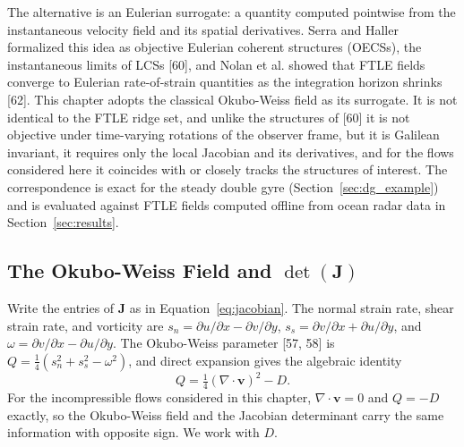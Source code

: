 \documentclass[12pt, letterpaper, oneside]{report}
\begin{document}
The alternative is an Eulerian surrogate: a quantity computed pointwise
from the instantaneous velocity field and its spatial derivatives. Serra
and Haller formalized this idea as objective Eulerian coherent structures
(OECSs), the instantaneous limits of LCSs [60], and Nolan et al. showed
that FTLE fields converge to Eulerian rate-of-strain quantities as the
integration horizon shrinks [62]. This chapter adopts the classical
Okubo-Weiss field as its surrogate. It is not identical to the FTLE ridge
set, and unlike the structures of [60] it is not objective under
time-varying rotations of the observer frame, but it is Galilean
invariant, it requires only the local Jacobian and its derivatives, and
for the flows considered here it coincides with or closely tracks the
structures of interest. The correspondence is exact for the steady double
gyre (Section~\ref{sec:dg_example}) and is evaluated against FTLE fields
computed offline from ocean radar data in Section~\ref{sec:results}.

\subsection{The Okubo-Weiss Field and \texorpdfstring{$\det(\mathbf{J})$}{det(J)}}

Write the entries of $\mathbf{J}$ as in Equation~\eqref{eq:jacobian}. The
normal strain rate, shear strain rate, and vorticity are
$s_n=\partial u/\partial x-\partial v/\partial y$,
$s_s=\partial v/\partial x+\partial u/\partial y$, and
$\omega=\partial v/\partial x-\partial u/\partial y$. The Okubo-Weiss
parameter [57, 58] is $Q=\tfrac14(s_n^2+s_s^2-\omega^2)$, and direct
expansion gives the algebraic identity
\begin{equation}
Q = \tfrac14(\nabla\cdot\mathbf{v})^2 - D.
\label{eq:okubo_weiss}
\end{equation}
For the incompressible flows considered in this chapter,
$\nabla\cdot\mathbf{v}=0$ and $Q=-D$ exactly, so the Okubo-Weiss field and
the Jacobian determinant carry the same information with opposite sign. We
work with $D$.
\end{document}
